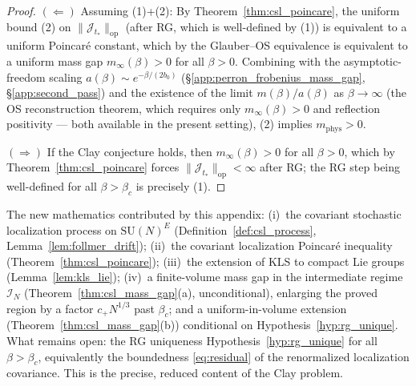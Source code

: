 \begin{proof}
$(\Leftarrow)$ Assuming (1)+(2): By Theorem~\ref{thm:csl_poincare},
the uniform bound (2) on $\|\mathcal{J}_{t_{*}}\|_{\mathrm{op}}$
(after RG, which is well-defined by (1)) is equivalent to a uniform
Poincar\'{e} constant, which by the Glauber--OS equivalence is
equivalent to a uniform mass gap $m_{\infty}(\beta)>0$ for all
$\beta>0$. Combining with the asymptotic-freedom scaling
$a(\beta)\sim e^{-\beta/(2b_{0})}$
(\S\ref{app:perron_frobenius_mass_gap}, \S\ref{app:second_pass}) and
the existence of the limit $m(\beta)/a(\beta)$ as
$\beta\to\infty$ (the OS reconstruction theorem, which requires only
$m_{\infty}(\beta)>0$ and reflection positivity — both available in
the present setting), (2) implies $m_{\mathrm{phys}}>0$.

$(\Rightarrow)$ If the Clay conjecture holds, then
$m_{\infty}(\beta)>0$ for all $\beta>0$, which by
Theorem~\ref{thm:csl_poincare} forces
$\|\mathcal{J}_{t_{*}}\|_{\mathrm{op}}<\infty$ after RG; the RG step
being well-defined for all $\beta>\beta_{c}$ is precisely (1).
\end{proof}

\begin{remark}
\label{rem:csl_new}
The new mathematics contributed by this appendix:
(i)~the covariant stochastic localization process on
$\mathrm{SU}(N)^{E}$ (Definition~\ref{def:csl_process},
Lemma~\ref{lem:follmer_drift});
(ii)~the covariant localization Poincar\'{e} inequality
(Theorem~\ref{thm:csl_poincare});
(iii)~the extension of KLS to compact Lie groups
(Lemma~\ref{lem:kls_lie});
(iv)~a finite-volume mass gap in the intermediate regime
$\mathcal{I}_{N}$ (Theorem~\ref{thm:csl_mass_gap}(a),
unconditional), enlarging the proved region by a factor
$c_{+}N^{1/3}$ past $\beta_{c}$; and a uniform-in-volume
extension (Theorem~\ref{thm:csl_mass_gap}(b)) conditional on
Hypothesis~\ref{hyp:rg_unique}.
What remains open: the RG uniqueness
Hypothesis~\ref{hyp:rg_unique} for all $\beta>\beta_{c}$,
equivalently the boundedness \eqref{eq:residual} of the
renormalized localization covariance. This is the precise,
reduced content of the Clay problem.
\end{remark}


